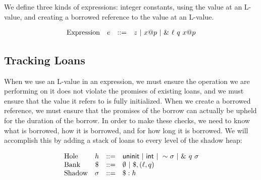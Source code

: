 We define three kinds of expressions: integer constants, using the value at an L-value, 
and creating a borrowed reference to the value at an L-value.

\[
\begin{array}{lccl}
\textrm{Expression} & e & ::= & z ~|~ {x}@{p} ~|~ \&~{{\ell}~{q}~{{x}@{p}}}
\end{array}
\]

\subsection*{Tracking Loans\footnotemark}


When we use an L-value in an expression, we must ensure the operation we are performing on it
does not violate the promises of existing loans, and we must ensure that the value it refers
to is fully initialized. When we create a borrowed reference, we must ensure that the
promises of the borrow can actually be upheld for the duration of the borrow.
In order to make these checks, we need to know what is borrowed, how it is borrowed, and for
how long it is borrowed. We will accomplish this by adding a stack of loans to every
level of the shadow heap:

\[
\begin{array}{lccl}
\textrm{Hole} & h & ::= & \mathsf{uninit} ~|~ \mathsf{int} ~|~ \sim{\sigma} ~|~ \&~{{q}~{\sigma}} \\
\textrm{Bank} & \$ & ::= & \emptyset ~|~ \$, (\ell,q) \\
\textrm{Shadow} & \sigma & ::= & \$:h \\
\end{array}
\]


